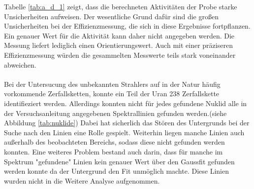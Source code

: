 Tabelle \ref{tab:a_d_1} zeigt, dass die berechneten Aktivitäten der Probe starke Unsicherheiten aufweisen.
Der wesentliche Grund dafür sind die großen Unsicherheiten bei der Effizienzmessung, die sich in diese Ergebnisse fortpflanzen.
Ein genauer Wert für die Aktivität kann daher nicht angegeben werden.
Die Messung liefert lediglich einen Orientierungswert.
Auch mit einer präziseren Effizienzmessung würden die gesammelten Messwerte teils stark voneinander abweichen.\\ \\
Bei der Untersucung des unbekannten Strahlers auf in der Natur häufig vorkommende Zerfallsketten, konnte
ein Teil der Uran 238 Zerfallskette identifieziert werden. Allerdings konnten nicht für jedes gefundene
Nuklid alle in der Versuchsanleitung angegebenen Spektrallinien gefunden werden.(siehe Abbildung \ref{tab:nuklide})
Dabei hat sicherlich das Stören des Untergrunds bei der Suche nach den Linien eine Rolle gespielt.
Weiterhin liegen manche Linien auch außerhalb des beobachteten Bereichs, sodass diese nicht gefunden werden konnten.
Eine weiteres Problem bestand auch darin, dass für manche im Spektrum "gefundene" Linien kein genauer
Wert über den Gaussfit gefunden werden konnte da der Untergrund den Fit unmöglich machte. Diese Linien wurden
nicht in die Weitere Analyse aufgenommen.
